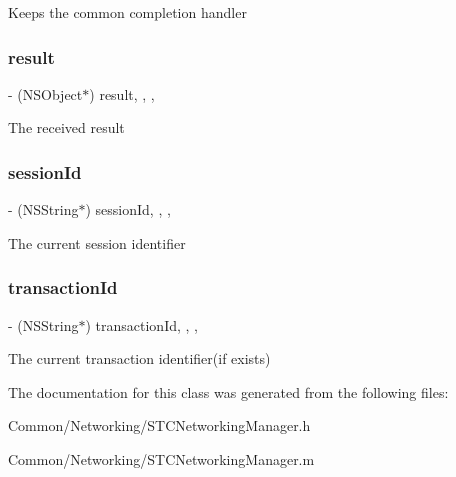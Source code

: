 Keeps the common completion handler \hypertarget{interface_s_t_c_networking_manager_a96a61eed2bada8b6f28246be241d4eb5}{}\label{interface_s_t_c_networking_manager_a96a61eed2bada8b6f28246be241d4eb5} 
\subsubsection{\texorpdfstring{result}{result}}
{\footnotesize\ttfamily -\/ (N\+S\+Object$\ast$) result\hspace{0.3cm}{\ttfamily [read]}, {\ttfamily [write]}, {\ttfamily [nonatomic]}, {\ttfamily [assign]}}

The received result \hypertarget{interface_s_t_c_networking_manager_a883a3c7d4bb40ab69762c5f640fd1ec0}{}\label{interface_s_t_c_networking_manager_a883a3c7d4bb40ab69762c5f640fd1ec0} 
\subsubsection{\texorpdfstring{session\+Id}{sessionId}}
{\footnotesize\ttfamily -\/ (N\+S\+String$\ast$) session\+Id\hspace{0.3cm}{\ttfamily [read]}, {\ttfamily [write]}, {\ttfamily [nonatomic]}, {\ttfamily [assign]}}

The current session identifier \hypertarget{interface_s_t_c_networking_manager_a98ab6e40acba2ec836eaf44f96d41c74}{}\label{interface_s_t_c_networking_manager_a98ab6e40acba2ec836eaf44f96d41c74} 
\subsubsection{\texorpdfstring{transaction\+Id}{transactionId}}
{\footnotesize\ttfamily -\/ (N\+S\+String$\ast$) transaction\+Id\hspace{0.3cm}{\ttfamily [read]}, {\ttfamily [write]}, {\ttfamily [nonatomic]}, {\ttfamily [assign]}}

The current transaction identifier(if exists) 

The documentation for this class was generated from the following files\+:\begin{DoxyCompactItemize}
\item 
Common/\+Networking/S\+T\+C\+Networking\+Manager.\+h\item 
Common/\+Networking/S\+T\+C\+Networking\+Manager.\+m\end{DoxyCompactItemize}
